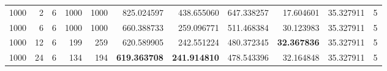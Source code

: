 \begin{table}
\begin{tabular}{rrrrrrrrrrr}
1000 & 2 & 6 & 1000 & 1000 & 825.024597 & 438.655060 & 647.338257 & 17.604601 & 35.327911 & 5 \\
1000 & 6 & 6 & 1000 & 1000 & 660.388733 & 259.096771 & 511.468384 & 30.123983 & 35.327911 & 5 \\
1000 & 12 & 6 & 199 & 259 & 620.589905 & 242.551224 & 480.372345 & \textbf{32.367836} & 35.327911 & 5 \\
1000 & 24 & 6 & 134 & 194 & \textbf{619.363708} & \textbf{241.914810} & 478.543396 & 32.164848 & 35.327911 & 5 \\
\bottomrule
\end{tabular}
\end{table}

